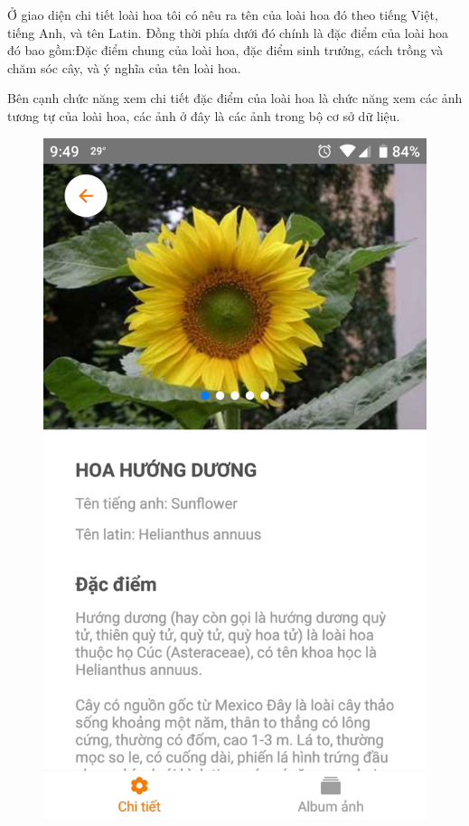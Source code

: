 \documentclass[12pt]{report}
\begin{document}
		\newpage
		Ở giao diện chi tiết loài hoa tôi có nêu ra tên của loài hoa đó theo tiếng Việt, tiếng Anh, và tên Latin. Đồng thời phía dưới đó chính là đặc điểm của loài hoa đó bao gồm:Đặc điểm chung của loài hoa, đặc điểm sinh trưởng, cách trồng và chăm sóc cây, và ý nghĩa của tên loài hoa.
				
		Bên cạnh chức năng xem chi tiết đặc điểm của loài hoa là chức năng xem các ảnh tương tự của loài hoa, các ảnh ở đây là các ảnh trong bộ cơ sở dữ liệu.
		\begin{figure}[h]
			\centering
			\includegraphics[scale=0.18]{app_detail1}

\end{figure}
\end{document}
